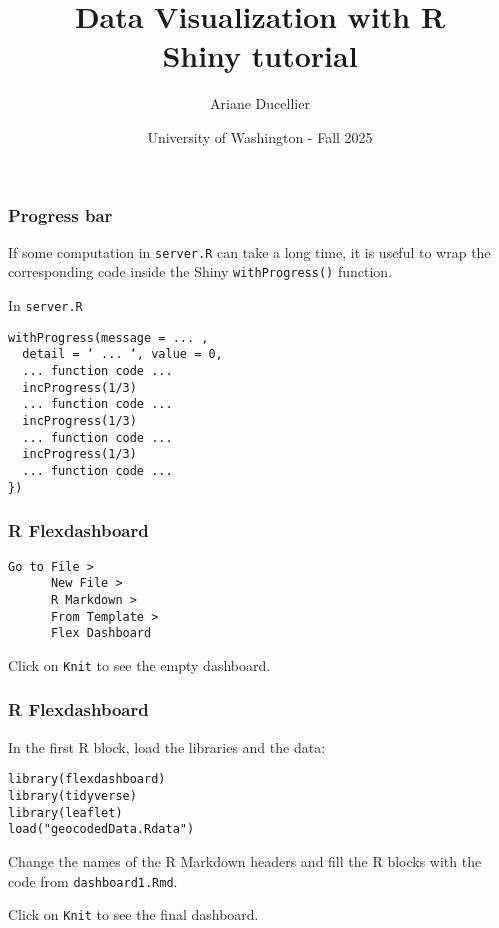 \documentclass{beamer}
\title[Data Visualization with R - Shiny tutorial]{Data Visualization with R \\ Shiny tutorial}
\author{Ariane Ducellier}
\date{University of Washington - Fall 2025}
\begin{document}
	\begin{frame}
		\titlepage
	\end{frame}

	\begin{frame}[fragile]
		\frametitle{Progress bar}

		If some computation in \verb|server.R| can take a long time, it is useful to wrap the corresponding code inside the Shiny \verb|withProgress()| function.

		\vspace{1em}

		In \verb|server.R|
		\begin{exampleblock}{}
		\begin{BVerbatim}
withProgress(message = ... ,
  detail = ‘ ... ‘, value = 0,
  ... function code ...
  incProgress(1/3)
  ... function code ...
  incProgress(1/3)
  ... function code ...
  incProgress(1/3)
  ... function code ...
})
		\end{BVerbatim}
		\end{exampleblock}{}

	\end{frame}

	\begin{frame}[fragile]
		\frametitle{R Flexdashboard}

		\begin{exampleblock}{}
		\begin{BVerbatim}
Go to File >
      New File >
      R Markdown >
      From Template >
      Flex Dashboard
		\end{BVerbatim}
		\end{exampleblock}{}

		\vspace{2em}

		Click on \verb|Knit| to see the empty dashboard.
	
	\end{frame}

	\begin{frame}[fragile]
		\frametitle{R Flexdashboard}

		In the first R block, load the libraries and the data:
		
		\begin{exampleblock}{}
		\begin{BVerbatim}
library(flexdashboard)
library(tidyverse)
library(leaflet)
load("geocodedData.Rdata")
		\end{BVerbatim}
		\end{exampleblock}{}

		\vspace{2em}

		Change the names of the R Markdown headers and fill the R blocks with the code from \verb|dashboard1.Rmd|.

		\vspace{2em}

		Click on \verb|Knit| to see the final dashboard.
	
	\end{frame}
\end{document}
